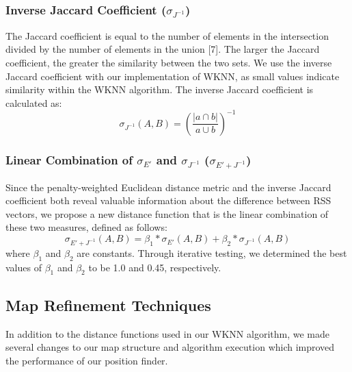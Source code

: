 \documentclass[twoside]{article}
\begin{document}
\begin{multicols}{2}
\subsubsection{Inverse Jaccard Coefficient ($\sigma_{J^{-1}}$)}
\indent The Jaccard coefficient is equal to the number of elements in the intersection divided by the number of elements in the union [7]. The larger the Jaccard coefficient, the greater the similarity between the two sets. We use the inverse Jaccard coefficient with our implementation of WKNN, as small values indicate similarity within the WKNN algorithm. The inverse Jaccard coefficient is calculated as:  
\begin{equation}
\label{jaccard}
\sigma_{J^{-1}}(A, B) = (\frac{|a\cap b|}{a\cup b})^{-1}
\end{equation}
\subsubsection{Linear Combination of $\sigma_{E'}$ and $\sigma_{J^{-1}}$ ($\sigma_{E' + J^{-1}}$)}
\indent Since the penalty-weighted Euclidean distance metric and the inverse Jaccard coefficient both reveal valuable information about the difference between RSS vectors, we propose a new distance function that is the linear combination of these two measures, defined as follows:
\begin{equation}
\label{combined}
\sigma_{E'+J^{-1}}(A, B) = \beta_1*\sigma_{E'}(A, B)+\beta_2*\sigma_{J^{-1}}(A, B)
\end{equation}
\indent where $\beta_1$ and $\beta_2$ are constants. Through iterative testing, we determined the best values of $\beta_1$ and $\beta_2$ to be 1.0 and 0.45, respectively.
	
\subsection{Map Refinement Techniques}
\indent In addition to the distance functions used in our WKNN algorithm, we made several changes to our map structure and algorithm execution which improved the performance of our position finder. 
	

\end{multicols}
\end{document}
